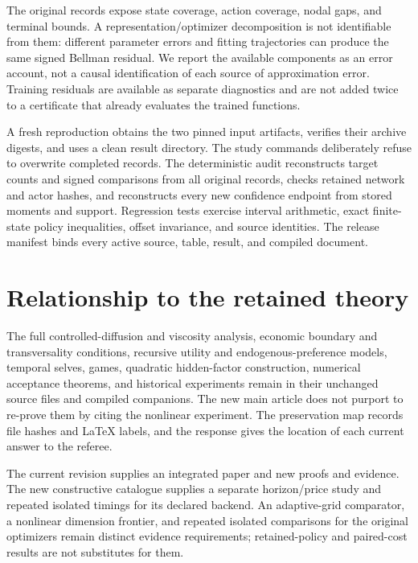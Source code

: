 \documentclass[ecta,nameyear,draft]{econsocart}
\begin{document}
The original records expose state coverage, action coverage, nodal gaps, and terminal bounds. A representation/optimizer decomposition is not identifiable from them: different parameter errors and fitting trajectories can produce the same signed Bellman residual. We report the available components as an error account, not a causal identification of each source of approximation error. Training residuals are available as separate diagnostics and are not added twice to a certificate that already evaluates the trained functions.

A fresh reproduction obtains the two pinned input artifacts, verifies their archive digests, and uses a clean result directory. The study commands deliberately refuse to overwrite completed records. The deterministic audit reconstructs target counts and signed comparisons from all original records, checks retained network and actor hashes, and reconstructs every new confidence endpoint from stored moments and support. Regression tests exercise interval arithmetic, exact finite-state policy inequalities, offset invariance, and source identities. The release manifest binds every active source, table, result, and compiled document.

\section{Relationship to the retained theory}
The full controlled-diffusion and viscosity analysis, economic boundary and transversality conditions, recursive utility and endogenous-preference models, temporal selves, games, quadratic hidden-factor construction, numerical acceptance theorems, and historical experiments remain in their unchanged source files and compiled companions. The new main article does not purport to re-prove them by citing the nonlinear experiment. The preservation map records file hashes and LaTeX labels, and the response gives the location of each current answer to the referee.

The current revision supplies an integrated paper and new proofs and evidence. The new constructive catalogue supplies a separate horizon/price study and repeated isolated timings for its declared backend. An adaptive-grid comparator, a nonlinear dimension frontier, and repeated isolated comparisons for the original optimizers remain distinct evidence requirements; retained-policy and paired-cost results are not substitutes for them.








\clearpage
\end{document}

